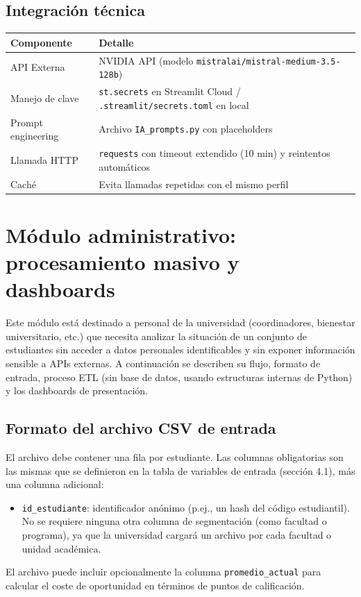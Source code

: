 \documentclass[12pt, spanish]{article}
\begin{document}
\subsection{Integración técnica}
\begin{table}[H]
\centering
\begin{tabular}{ll}
\toprule
\textbf{Componente} & \textbf{Detalle} \\
\midrule
API Externa & NVIDIA API (modelo \texttt{mistralai/mistral-medium-3.5-128b}) \\
Manejo de clave & \texttt{st.secrets} en Streamlit Cloud / \texttt{.streamlit/secrets.toml} en local \\
Prompt engineering & Archivo \texttt{IA\_prompts.py} con placeholders \\
Llamada HTTP & \texttt{requests} con timeout extendido (10 min) y reintentos automáticos \\
Caché & Evita llamadas repetidas con el mismo perfil \\
\bottomrule
\end{tabular}
\end{table}

\section{Módulo administrativo: procesamiento masivo y dashboards}

Este módulo está destinado a personal de la universidad (coordinadores, bienestar universitario, etc.) que necesita analizar la situación de un conjunto de estudiantes sin acceder a datos personales identificables y sin exponer información sensible a APIs externas. A continuación se describen su flujo, formato de entrada, proceso ETL (sin base de datos, usando estructuras internas de Python) y los dashboards de presentación.

\subsection{Formato del archivo CSV de entrada}
El archivo debe contener una fila por estudiante. Las columnas obligatorias son las mismas que se definieron en la tabla de variables de entrada (sección 4.1), más una columna adicional:
\begin{itemize}
    \item \texttt{id\_estudiante}: identificador anónimo (p.ej., un hash del código estudiantil). No se requiere ninguna otra columna de segmentación (como facultad o programa), ya que la universidad cargará un archivo por cada facultad o unidad académica.
\end{itemize}
El archivo puede incluir opcionalmente la columna \texttt{promedio\_actual} para calcular el coste de oportunidad en términos de puntos de calificación.
\end{document}

